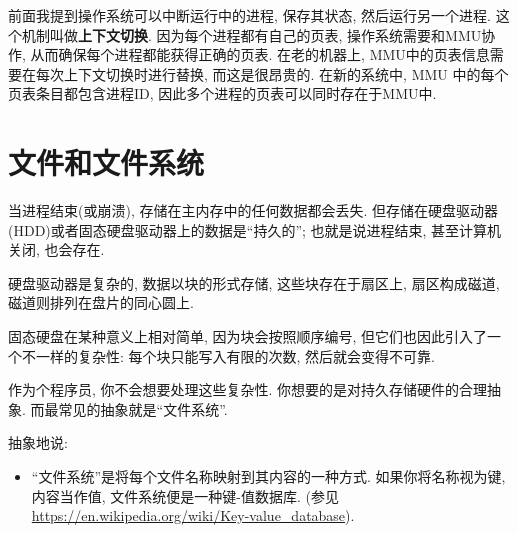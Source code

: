 \documentclass[12pt]{book}
\begin{document}
{前面我提到操作系统可以中断运行中的进程, 保存其状态, 然后运行另一个进程.
这个机制叫做{\bf 上下文切换}. 因为每个进程都有自己的页表, 操作系统需要和MMU协作,
从而确保每个进程都能获得正确的页表.
在老的机器上, MMU中的页表信息需要在每次上下文切换时进行替换, 
而这是很昂贵的.
在新的系统中, MMU 中的每个页表条目都包含进程ID, 因此多个进程的页表可以同时存在于MMU中.

\chapter{文件和文件系统}
%
%
当进程结束(或崩溃), 存储在主内存中的任何数据都会丢失.
但存储在硬盘驱动器(HDD)或者固态硬盘驱动器上的数据是``持久的'';
也就是说进程结束, 甚至计算机关闭, 也会存在.

硬盘驱动器是复杂的, 数据以块的形式存储, 
这些块存在于扇区上, 扇区构成磁道, 
磁道则排列在盘片的同心圆上.

固态硬盘在某种意义上相对简单, 
因为块会按照顺序编号, 但它们也因此引入了一个不一样的复杂性:
每个块只能写入有限的次数, 然后就会变得不可靠.

%
作为个程序员, 你不会想要处理这些复杂性.
你想要的是对持久存储硬件的合理抽象.
而最常见的抽象就是``文件系统''.

抽象地说:

\begin{itemize}
%
\item ``文件系统''是将每个文件名称映射到其内容的一种方式.
如果你将名称视为键, 内容当作值, 文件系统便是一种键-值数据库.
(参见 \url{https://en.wikipedia.org/wiki/Key-value_database}).


\end{itemize}}
\end{document}
